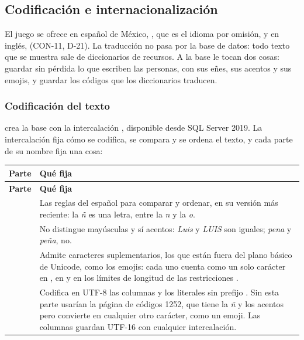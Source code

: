 \subsection*{Codificación e internacionalización}

El juego se ofrece en español de México, , que es el idioma por omisión, y en inglés,  (\mbox{CON-11}, \mbox{D-21}). La traducción no pasa por la base de datos: todo texto que se muestra sale de diccionarios de recursos. A la base le tocan dos cosas: guardar sin pérdida lo que escriben las personas, con sus eñes, sus acentos y sus emojis, y guardar los códigos que los diccionarios traducen.

\subsubsection*{Codificación del texto}

 crea la base con la intercalación , disponible desde SQL Server 2019. La intercalación fija cómo se codifica, se compara y se ordena el texto, y cada parte de su nombre fija una cosa:

\begin{center}\small
\begin{longtable}{|L{0.25\textwidth}|L{0.65\textwidth}|}
\hline
\textbf{Parte} & \textbf{Qué fija} \\ \hline
\endfirsthead
\hline
\textbf{Parte} & \textbf{Qué fija} \\ \hline
\endhead
{} & Las reglas del español para comparar y ordenar, en su versión más reciente: la \textit{ñ} es una letra, entre la \textit{n} y la \textit{o}. \\ \hline
{} & No distingue mayúsculas y sí acentos: \textit{Luis} y \textit{LUIS} son iguales; \textit{pena} y \textit{peña}, no. \\ \hline
{} & Admite caracteres suplementarios, los que están fuera del plano básico de Unicode, como los emojis: cada uno cuenta como un solo carácter en , en  y en los límites de longitud de las restricciones . \\ \hline
{} & Codifica en UTF-8 las columnas  y los literales sin prefijo . Sin esta parte usarían la página de códigos 1252, que tiene la \textit{ñ} y los acentos pero convierte en  cualquier otro carácter, como un emoji. Las columnas  guardan UTF-16 con cualquier intercalación. \\ \hline
\end{longtable}
\end{center}

